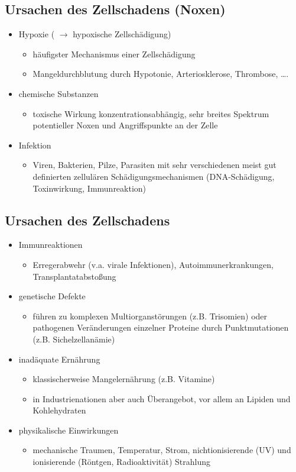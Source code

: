 \subsection{Ursachen des Zellschadens (Noxen)}
	\begin{itemize}
		\item Hypoxie ( $\rightarrow$  hypoxische Zellschädigung)
			\begin{itemize}
				\item häufigster Mechanismus einer Zellschädigung
				\item Mangeldurchblutung durch Hypotonie, Arteriosklerose, Thrombose, ….
			\end{itemize}
		\item chemische Substanzen
			\begin{itemize}
				\item toxische Wirkung konzentrationsabhängig, sehr breites Spektrum potentieller Noxen und Angriffspunkte an der Zelle
			\end{itemize}
		\item Infektion
			\begin{itemize}
				\item Viren, Bakterien, Pilze, Parasiten mit sehr verschiedenen meist gut definierten zellulären Schädigungsmechanismen (DNA-Schädigung, Toxinwirkung, Immunreaktion)
			\end{itemize}
	\end{itemize}

\subsection{Ursachen des Zellschadens}
	\begin{itemize}
		\item Immunreaktionen
			\begin{itemize}
				\item Erregerabwehr (v.a. virale Infektionen), Autoimmunerkrankungen, Transplantatabstoßung
			\end{itemize}
		\item genetische Defekte
			\begin{itemize}
				\item führen zu komplexen Multiorganstörungen (z.B. Trisomien)  oder pathogenen Veränderungen einzelner Proteine durch Punktmutationen (z.B. Sichelzellanämie)
			\end{itemize}
		\item inadäquate Ernährung
			\begin{itemize}
				\item klassischerweise Mangelernährung (z.B. Vitamine)
				\item in Industrienationen aber auch Überangebot, vor allem an Lipiden und Kohlehydraten
			\end{itemize}
		\item physikalische Einwirkungen
			\begin{itemize}
				\item mechanische Traumen, Temperatur, Strom,  nichtionisierende (UV) und ionisierende (Röntgen, Radioaktivität) Strahlung
			\end{itemize}
	\end{itemize}

